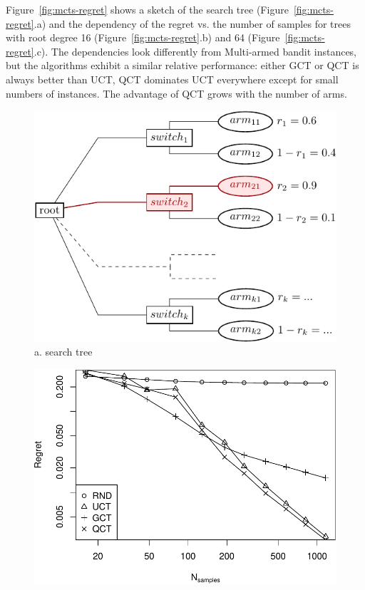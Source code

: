 \documentclass{article}
\begin{document}
Figure~\ref{fig:mcts-regret} shows a sketch of the search tree
(Figure~\ref{fig:mcts-regret}.a) and the dependency of the regret vs. the
number of samples for trees with root degree 16
(Figure~\ref{fig:mcts-regret}.b) and 64 (Figure~\ref{fig:mcts-regret}.c). The
dependencies look differently from Multi-armed bandit instances, but
the algorithms exhibit a similar relative performance: either GCT or QCT
is always better than UCT, QCT dominates UCT everywhere
except for small numbers of instances. The advantage of QCT grows with
the number of arms.

\begin{figure}
  \begin{minipage}[c]{0.5\linewidth}
    \centering
    \includegraphics[scale=0.8]{twolevel-tree.pdf}\\
    a. search tree
  \end{minipage}
  \begin{minipage}[c]{0.5\linewidth}
    \centering
    \includegraphics[scale=0.4]{tree-identity-k=16-uqb=8.pdf}\\ 

\end{minipage}
\end{figure}
\end{document}
